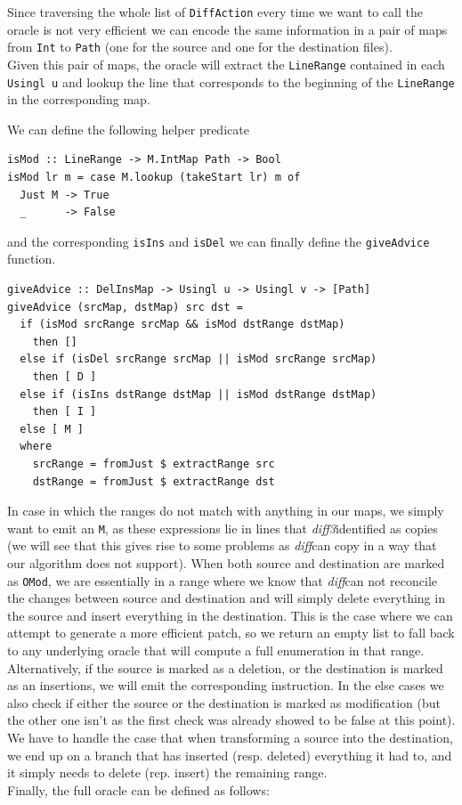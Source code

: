 \documentclass[11pt, titlepage]{article}
\newcommand{\toHaskell}[1]{\texttt{#1}\xspace}
\newcommand{\diffthree}{\emph{diff3}}
\newcommand{\diff}{\emph{diff}}
\begin{document}
Since traversing the whole list of \toHaskell{DiffAction} every time we want to call the oracle is not very efficient we can encode the same information in a pair of maps from \toHaskell{Int} to \toHaskell{Path} (one for the source and one for the destination files). 
\\
Given this pair of maps, the oracle will extract the \toHaskell{LineRange} contained in each \toHaskell{Usingl u} and lookup the line that corresponds to the beginning of the \toHaskell{LineRange} in the corresponding map. 

We can define the following helper predicate

\begin{verbatim}
isMod :: LineRange -> M.IntMap Path -> Bool
isMod lr m = case M.lookup (takeStart lr) m of
  Just M -> True
  _      -> False
\end{verbatim}
and the corresponding \toHaskell{isIns} and \toHaskell{isDel} we can finally define the \toHaskell{giveAdvice} function.

\begin{verbatim}
giveAdvice :: DelInsMap -> Usingl u -> Usingl v -> [Path]
giveAdvice (srcMap, dstMap) src dst =
  if (isMod srcRange srcMap && isMod dstRange dstMap)
    then []
  else if (isDel srcRange srcMap || isMod srcRange srcMap)
    then [ D ]
  else if (isIns dstRange dstMap || isMod dstRange dstMap)
    then [ I ]
  else [ M ]
  where
    srcRange = fromJust $ extractRange src
    dstRange = fromJust $ extractRange dst

\end{verbatim}

In case in which the ranges do not match with anything in our maps, we simply want to emit an \toHaskell{M}, as these expressions lie in lines that \diffthree identified as copies (we will see that this gives rise to some problems as \diff can copy in a way that our algorithm does not support). 
When both source and destination are marked as \toHaskell{OMod}, we are essentially in a range where we know that \diff can not reconcile the changes between source and destination  and will simply delete everything in the source and insert everything in the  destination. 
This is the case where we can attempt to generate a more efficient patch, so we return an empty list to fall back to any underlying oracle that will compute a full enumeration in that range. 
\\
Alternatively, if the source is marked as a deletion, or the destination is marked as an insertions, we will emit the corresponding instruction.
In the else cases we also check if either the source or the destination is marked as modification (but the other one isn't as the first check was already showed to be false at this point). We have to handle the case that when transforming a source into the destination, we end up on a branch that has inserted (resp. deleted) everything it had to, and it simply needs to delete (rep. insert) the remaining range.
\\
Finally, the full oracle can be defined as follows:
\end{document}
